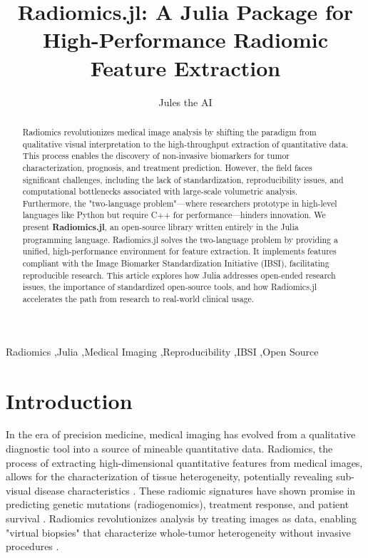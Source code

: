 \documentclass[preprint,12pt]{elsarticle}
\begin{document}
\begin{frontmatter}

\title{Radiomics.jl: A Julia Package for High-Performance Radiomic Feature Extraction}

\author[1]{Jules the AI}

\address[1]{Artificial Intelligence Lab}

\begin{abstract}
Radiomics revolutionizes medical image analysis by shifting the paradigm from qualitative visual interpretation to the high-throughput extraction of quantitative data. This process enables the discovery of non-invasive biomarkers for tumor characterization, prognosis, and treatment prediction. However, the field faces significant challenges, including the lack of standardization, reproducibility issues, and computational bottlenecks associated with large-scale volumetric analysis. Furthermore, the "two-language problem"—where researchers prototype in high-level languages like Python but require C++ for performance—hinders innovation. We present \textbf{Radiomics.jl}, an open-source library written entirely in the Julia programming language. Radiomics.jl solves the two-language problem by providing a unified, high-performance environment for feature extraction. It implements features compliant with the Image Biomarker Standardization Initiative (IBSI), facilitating reproducible research. This article explores how Julia addresses open-ended research issues, the importance of standardized open-source tools, and how Radiomics.jl accelerates the path from research to real-world clinical usage.
\end{abstract}

\begin{keyword}
Radiomics \sep Julia \sep Medical Imaging \sep Reproducibility \sep IBSI \sep Open Source
\end{keyword}

\end{frontmatter}


\section{Introduction}

In the era of precision medicine, medical imaging has evolved from a qualitative diagnostic tool into a source of mineable quantitative data. Radiomics, the process of extracting high-dimensional quantitative features from medical images, allows for the characterization of tissue heterogeneity, potentially revealing sub-visual disease characteristics \cite{NiocheOrlhac2018}. These radiomic signatures have shown promise in predicting genetic mutations (radiogenomics), treatment response, and patient survival \cite{TonneauPhan2023}. Radiomics revolutionizes analysis by treating images as data, enabling "virtual biopsies" that characterize whole-tumor heterogeneity without invasive procedures \cite{NiocheOrlhac2018, TonneauPhan2023}.
\end{document}
